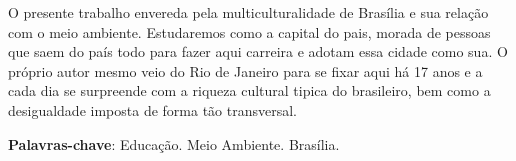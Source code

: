 
\setlength{\absparsep}{18pt} %
\begin{resumo}
 O presente trabalho envereda pela multiculturalidade de Brasília e sua relação com o meio ambiente. Estudaremos como a capital do pais, morada de pessoas que saem do país todo para fazer aqui carreira e adotam essa cidade como sua. O próprio autor mesmo veio do Rio de Janeiro para se fixar aqui há 17 anos e a cada dia se surpreende com a riqueza cultural tipica do brasileiro, bem como a desigualdade imposta de forma tão transversal.

 \textbf{Palavras-chave}: Educação. Meio Ambiente. Brasília.
\end{resumo}
